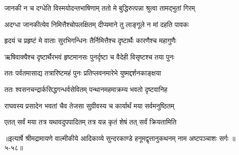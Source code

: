 \twolineshloka
{जानकी न च दग्धेति विस्मयोदन्तभाषिणाम्}
{ततो मे बुद्धिरुत्पन्ना श्रुत्वा तामद्भुतां गिरम्} %

\twolineshloka
{अदग्धा जानकीत्येव निमित्तैश्चोपलक्षितम्}
{दीप्यमाने तु लाङ्गूले न मां दहति पावकः} %

\twolineshloka
{हृदयं च प्रहृष्टं मे वाताः सुरभिगन्धिनः}
{तैर्निमित्तैश्च दृष्टार्थैः कारणैश्च महागुणैः} %

\twolineshloka
{ऋषिवाक्यैश्च दृष्टार्थैरभवं हृष्टमानसः}
{पुनर्दृष्टा च वैदेही विसृष्टश्च तया पुनः} %

\twolineshloka
{ततः पर्वतमासाद्य तत्रारिष्टमहं पुनः}
{प्रतिप्लवनमारेभे युष्मद्दर्शनकाङ्क्षया} %

\twolineshloka
{ततः श्वसनचन्द्रार्कसिद्धगन्धर्वसेवितम्}
{पन्थानमहमाक्रम्य भवतो दृष्टवानिह} %

\twolineshloka
{राघवस्य प्रसादेन भवतां चैव तेजसा}
{सुग्रीवस्य च कार्यार्थं मया सर्वमनुष्ठितम्} %

\twolineshloka
{एतत् सर्वं मया तत्र यथावदुपपादितम्}
{तत्र यन्न कृतं शेषं तत् सर्वं क्रियतामिति} %


॥इत्यार्षे श्रीमद्रामायणे वाल्मीकीये आदिकाव्ये सुन्दरकाण्डे हनूमद्वृत्तानुकथनम् नाम अष्टपञ्चाशः सर्गः ॥५-५८॥
